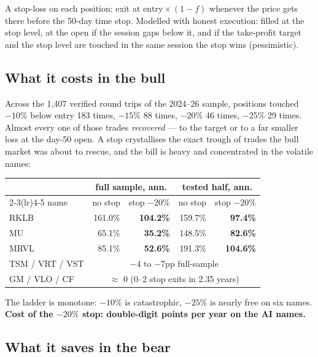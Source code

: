 \documentclass[11pt,a4paper]{article}
\newcommand{\bad}[1]{{\color{bcred}\textbf{#1}}}
\begin{document}
A stop-loss on each position: exit at $\text{entry} \times (1-f)$ whenever the
price gets there before the 50-day time stop. Modelled with honest execution:
filled at the stop level, at the open if the session gaps below it, and if the
take-profit target and the stop level are touched in the same session the stop
wins (pessimistic).

\subsection{What it costs in the bull}

Across the 1{,}407 verified round trips of the 2024--26 sample, positions touched
$-10\%$ below entry 183 times, $-15\%$ 88 times, $-20\%$ 46 times, $-25\%$ 29
times. Almost every one of those trades \emph{recovered} --- to the target or to a
far smaller loss at the day-50 open. A stop crystallises the exact trough of
trades the bull market was about to rescue, and the bill is heavy and
concentrated in the volatile names:

\begin{center}
\begin{tabular}{lrrrr}
\toprule
 & \multicolumn{2}{c}{full sample, ann.} & \multicolumn{2}{c}{tested half, ann.} \\
\cmidrule(lr){2-3}\cmidrule(lr){4-5}
name & no stop & stop $-20\%$ & no stop & stop $-20\%$ \\
\midrule
RKLB & 161.0\% & \bad{104.2\%} & 159.7\% & \bad{97.4\%} \\
MU   & 65.1\%  & \bad{35.2\%}  & 148.5\% & \bad{82.6\%} \\
MRVL & 85.1\%  & \bad{52.6\%}  & 191.3\% & \bad{104.6\%} \\
TSM / VRT / VST & \multicolumn{4}{c}{$-4$ to $-7$pp full-sample} \\
GM / VLO / CF   & \multicolumn{4}{c}{$\approx$ 0 (0--2 stop exits in 2.35 years)} \\
\bottomrule
\end{tabular}
\end{center}

The ladder is monotone: $-10\%$ is catastrophic, $-25\%$ is nearly free on six
names. \textbf{Cost of the $-20\%$ stop: double-digit points per year on the AI
names.}

\subsection{What it saves in the bear}
\end{document}

